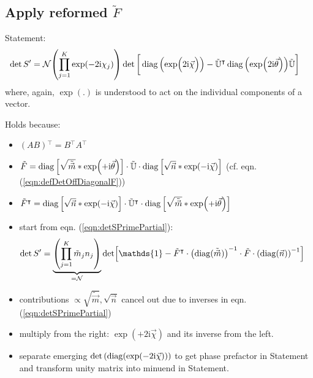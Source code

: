 \documentclass[
	english,
	a4paper,
	fontsize=10pt,
	parskip=half,
	titlepage=true,
	DIV=12,
	final
]{scrreprt}
\newcommand*{\transp}{\ensuremath{^\intercal}}
\newcommand*{\iunit}{\ensuremath{\mathrm{i}}}
\DeclareMathOperator{\diag}{diag}
\begin{document}
\subsection{Apply reformed $\tilde{F}$}
Statement:
\begin{align}
	\det S'
&=
	\mathcal{N}
	\qty( \prod_{j=1}^{K} \exp(-2\iunit \chi_j) )
	\det\qty[\bigg.
		\diag\qty(\exp(\Big.2\iunit\vec{\chi}))
		-
		\tilde{\mathbb{U}}\transp
		\diag\qty(\exp(2\iunit\vec{\theta}))
		\tilde{\mathbb{U}}
	]
\end{align}
where, again, $\exp(.)$ is understood to act on the individual components of a vector.

Holds because:
\begin{itemize}
\item $(AB)\transp = B\transp A\transp$
\item $\tilde{F}
=
	\diag\qty[ \sqrt{ \tilde{\vec{m}}} * \exp(+\iunit \vec{\theta}) ]
	\cdot \tilde{\mathbb{U}} \cdot
	\diag\qty[ \sqrt{        \vec{n} } * \exp(-\iunit \vec{\chi  }) ]$
	(cf. eqn. (\ref{eqn:defDetOffDiagonalF}))
\item $\tilde{F}\transp
=
	\diag\qty[ \sqrt{        \vec{n} } * \exp(-\iunit \vec{\chi  }) ]
	\cdot \tilde{\mathbb{U}}\transp \cdot
	\diag\qty[ \sqrt{ \tilde{\vec{m}}} * \exp(+\iunit \vec{\theta}) ]$
\item start from eqn. (\ref{eqn:detSPrimePartial}):
	\begin{align*}
		\det S'
	&=
		\underbrace{
			\qty( \prod_{j=1}^{K} \tilde{m}_j n_j )
		}_{= \mathcal{N} }
		\det[
			\mathds{1} -
			\tilde{F}\transp \cdot \qty( \diag(\tilde{\vec{m}}) )^{-1}
			\cdot
			\tilde{F} \cdot \qty( \diag(\vec{n}) )^{-1}
		]
	\end{align*}
\item contributions $\propto \sqrt{\tilde{\vec{m}}}, \sqrt{\vec{n}}$ cancel out due to inverses in eqn.
	(\ref{eqn:detSPrimePartial})
\item multiply from the right: $\exp(+2\iunit \vec{\chi})$ and its inverse from the left.
\item separate emerging $\det\qty(\diag(\exp(-2\iunit \vec{\chi})))$ to get phase prefactor in Statement and transform unity matrix into minuend in Statement.
\end{itemize}
\end{document}
